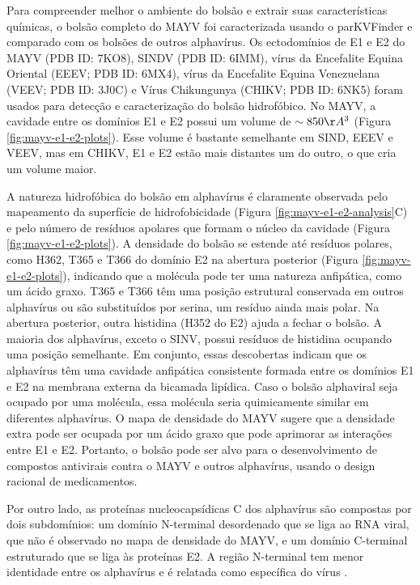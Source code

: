 \documentclass[Portugues]{phdquali}
\begin{document}
Para compreender melhor o ambiente do bolsão e extrair suas características químicas, o bolsão completo do MAYV foi caracterizada usando o parKVFinder \cite{guerra2020} e comparado com os bolsões de outros alphavírus. Os ectodomínios de E1 e E2 do MAYV (PDB ID: 7KO8), SINDV (PDB ID: 6IMM), vírus da Encefalite Equina Oriental (EEEV; PDB ID: 6MX4), vírus da Encefalite Equina Venezuelana (VEEV; PDB ID: 3J0C) e Vírus Chikungunya (CHIKV; PDB ID: 6NK5) foram usados para detecção e caracterização do bolsão hidrofóbico. No MAYV, a cavidade entre os domínios E1 e E2 possui um volume de $\sim850 \AA^3$ (Figura \ref{fig:mayv-e1-e2-plots}). Esse volume é bastante semelhante em SIND, EEEV e VEEV, mas em CHIKV, E1 e E2 estão mais distantes um do outro, o que cria um volume maior.

A natureza hidrofóbica do bolsão em alphavírus é claramente observada pelo mapeamento da superfície de hidrofobicidade (Figura \ref{fig:mayv-e1-e2-analysis}C) e pelo número de resíduos apolares que formam o núcleo da cavidade (Figura \ref{fig:mayv-e1-e2-plots}). A densidade do bolsão se estende até resíduos polares, como H362, T365 e T366 do domínio E2 na abertura posterior (Figura \ref{fig:mayv-e1-e2-plots}), indicando que a molécula pode ter uma natureza anfipática, como um ácido graxo. T365 e T366 têm uma posição estrutural conservada em outros alphavírus ou são substituídos por serina, um resíduo ainda mais polar. Na abertura posterior, outra histidina (H352 do E2) ajuda a fechar o bolsão. A maioria dos alphavírus, exceto o SINV, possui resíduos de histidina ocupando uma posição semelhante. Em conjunto, essas descobertas indicam que os alphavírus têm uma cavidade anfipática consistente formada entre os domínios E1 e E2 na membrana externa da bicamada lipídica. Caso o bolsão alphaviral seja ocupado por uma molécula, essa molécula seria quimicamente similar em diferentes alphavírus. O mapa de densidade do MAYV sugere que a densidade extra pode ser ocupada por um ácido graxo que pode aprimorar as interações entre E1 e E2. Portanto, o bolsão pode ser alvo para o desenvolvimento de compostos antivirais contra o MAYV e outros alphavírus, usando o design racional de medicamentos.

Por outro lado, as proteínas nucleocapsídicas C dos alphavírus são compostas por dois subdomínios: um domínio N-terminal desordenado que se liga ao RNA viral, que não é observado no mapa de densidade do MAYV, e um domínio C-terminal estruturado que se liga às proteínas E2. A região N-terminal tem menor identidade entre os alphavírus e é relatada como específica do vírus \cite{ribeiro2021}.
\end{document}

